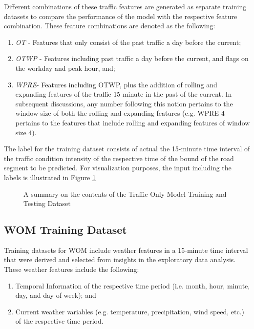 Different combinations of these traffic features are generated as separate training datasets to compare the performance of the model with the respective feature combination. These feature combinations are denoted as the following: 

\begin{enumerate}
\item \textit{OT} - Features that only consist of the past traffic a day before the current;
\item \textit{OTWP} - Features including past traffic a day before the current, and flags on the workday and peak hour, and;
\item \textit{WPRE}- Features including OTWP, plus the addition of rolling and expanding features of the traffic 15 minute in the past of the current. In subsequent discussions, any number following this notion pertains to the window size of both the rolling and expanding features (e.g. WPRE 4 pertains to the features that include rolling and expanding features of window size 4).
\end{enumerate}

The label for the training dataset consists of actual the 15-minute time interval of the traffic condition intensity of the respective time of the bound of the road segment to be predicted. For visualization purposes, the input including the labels is illustrated in Figure \ref{fig:TOM_TrainingTestingInput}


\begin{figure}
\centering
\captionsetup{justification=centering}
\caption{A summary on the contents of the Traffic Only Model Training and Testing Dataset}
\label{fig:TOM_TrainingTestingInput}
\end{figure}

\subsection{WOM Training Dataset}
Training datasets for WOM include weather features in a 15-minute time interval that were derived and selected from insights in the exploratory data analysis. These weather features include the following:
\begin{enumerate}
\item Temporal Information of the respective time period (i.e. month, hour, minute, day, and day of week); and
\item Current weather variables (e.g. temperature, precipitation, wind speed, etc.) of the respective time period.
\end{enumerate}

